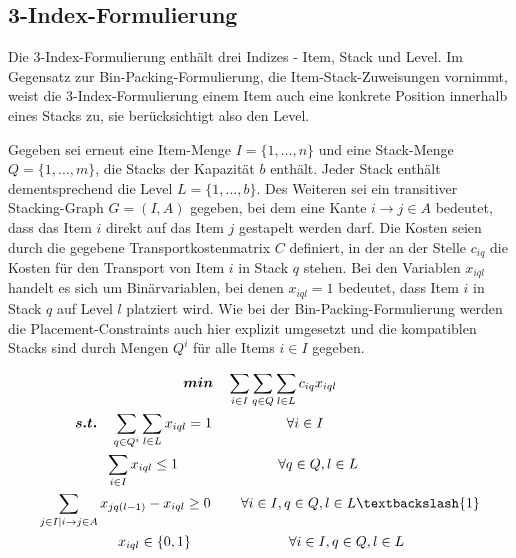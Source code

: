 \subsection{3-Index-Formulierung}
\label{sec:three_idx_formulation}

Die 3-Index-Formulierung enthält drei Indizes - Item, Stack und Level.
Im Gegensatz zur Bin-Packing-Formulierung, die Item-Stack-Zuweisungen vornimmt, weist die 3-Index-Formulierung einem
Item auch eine konkrete Position innerhalb eines Stacks zu, sie berücksichtigt also den Level.

Gegeben sei erneut eine Item-Menge $I = \{1, \dotsc, n\}$ und eine Stack-Menge $Q = \{1, \dotsc, m\}$, die Stacks der Kapazität $b$ enthält.
Jeder Stack enthält dementsprechend die Level $L = \{1, \dotsc, b\}$. Des Weiteren sei ein transitiver Stacking-Graph
$G = (I, A)$ gegeben, bei dem eine Kante $i \rightarrow j \in A$ bedeutet, dass das Item $i$ direkt auf das Item $j$ gestapelt werden darf.
Die Kosten seien durch die gegebene Transportkostenmatrix $C$ definiert, in der an der Stelle $c_{iq}$ die Kosten für den
Transport von Item $i$ in Stack $q$ stehen. Bei den Variablen $x_{iql}$ handelt es sich um Binärvariablen,
bei denen $x_{iql} = 1$ bedeutet, dass Item $i$ in Stack $q$ auf Level $l$ platziert wird. Wie bei der Bin-Packing-Formulierung
werden die Placement-Constraints auch hier explizit umgesetzt und die kompatiblen Stacks sind durch Mengen $Q^i$ für
alle Items $i \in I$ gegeben.

\begin{gather}
\boldsymbol{min} \quad \sum_{i \in I} \sum_{q \in Q} \sum_{l \in L} c_{iq} x_{iql} \label{three_idx_line_one} \\
\boldsymbol{s.t.} \quad \sum_{q \in Q^i} \sum_{l \in L} x_{iql} = 1 \quad\thinspace\thinspace\quad\quad\quad\quad \forall i \in I \thinspace\thinspace\quad\quad\quad\quad\quad\quad\quad\quad\thinspace\thinspace \label{three_idx_line_two} \\
\sum_{i \in I} x_{iql} \leq 1 \thinspace\quad\quad\quad\quad\quad\quad\quad \forall q \in Q, l \in L \thinspace\thinspace\thinspace\thinspace\quad\quad\quad\thinspace \label{three_idx_line_three} \\
\sum_{j \in I | i \rightarrow j \in A} x_{jq(l-1)} - x_{iql} \geq 0 \thinspace\quad\quad \forall i \in I, q \in Q, l \in L \textbackslash \{1\}
\label{three_idx_line_four} \\
\quad\quad x_{iql} \in \{0, 1\} \quad\quad\quad\quad\quad\quad\quad \forall i \in I, q \in Q, l \in L \quad\thinspace\thinspace\thinspace\thinspace\thinspace \label{three_idx_line_five}
\end{gather}

